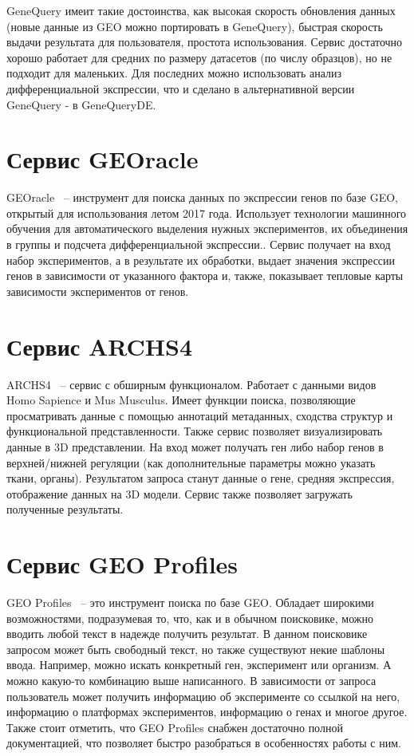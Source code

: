 \documentclass[times,specification,annotation]{itmo-student-thesis}
\begin{document}
GeneQuery имеит такие достоинства, как высокая скорость обновления данных (новые данные из GEO можно портировать в GeneQuery), быстрая скорость выдачи результата для пользователя, простота использования. Сервис достаточно хорошо работает для средних по размеру датасетов (по числу образцов), но не подходит для маленьких. Для последних можно использовать анализ дифференциальной экспрессии, что и сделано в альтернативной версии GeneQuery - в GeneQueryDE. 

\section{Сервис GEOracle}

GEOracle\cite{GEOracle} ~-- инструмент для поиска данных по экспрессии генов по базе GEO, открытый для использования летом 2017 года. Использует технологии машинного обучения для автоматического выделения нужных экспериментов, их объединения в группы и подсчета дифференциальной экспрессии.\cite{GEOracleArticle}. Сервис получает на вход набор экспериментов, а в результате их обработки, выдает значения экспрессии генов в зависимости от указанного фактора и, также, показывает тепловые карты зависимости экспериментов от генов.

\section{Сервис ARCHS4}

ARCHS4\cite{ARCHS4} ~-- сервис с обширным функционалом. Работает с данными видов Homo Sapience и Mus Musculus. Имеет функции поиска, позволяющие просматривать данные с помощью аннотаций метаданных, сходства структур и функциональной представленности.\cite{ARCHS4help} Также сервис позволяет визуализировать данные в 3D представлении. На вход может получать ген либо набор генов в верхней/нижней регуляции (как дополнительные параметры можно указать ткани, органы). Результатом запроса станут данные о гене, средняя экспрессия, отображение данных на 3D модели. Сервис также позволяет загружать полученные результаты. 

\section{Сервис GEO Profiles}

GEO Profiles\cite{GEOprofiles} ~-- это инструмент поиска по базе GEO. Обладает широкими возможностями, подразумевая то, что, как и в обычном поисковике, можно вводить любой текст в надежде получить результат. В данном поисковике запросом может быть свободный текст, но также существуют некие шаблоны ввода. Например, можно искать конкретный ген, эксперимент или организм. А можно какую-то комбинацию выше написанного. В зависимости от запроса пользователь может получить информацию об эксперименте со ссылкой на него, информацию о платформах экспериментов, информацию о генах и многое другое. Также стоит отметить, что GEO Profiles снабжен достаточно полной документацией, что позволяет быстро разобраться в особенностях работы с ним.
\end{document}
